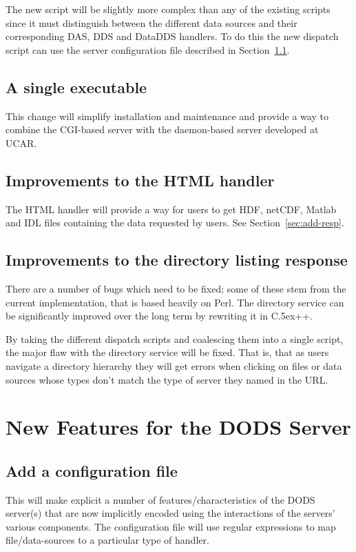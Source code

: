 \documentclass{article}
\newcommand{\Cpp}{\rm {\small C}\raise.5ex\hbox{\footnotesize ++}\xspace}
\begin{document}
The new script will be slightly more complex than any of the existing scripts
since it must distinguish between the different data sources and their
corresponding DAS, DDS and DataDDS handlers. To do this the new dispatch
script can use the server configuration file described in
Section~\ref{sec:config}. 

\subsection{A single executable}
This change will simplify installation and maintenance and provide a way to
combine the CGI-based server with the daemon-based server developed at UCAR.

\subsection{Improvements to the HTML handler}
The HTML handler will provide a way for users to get HDF, netCDF, Matlab and
IDL files containing the data requested by users. See
Section~\ref{sec:add-resp}.

\subsection{Improvements to the directory listing response}
\label{sec:directory}
There are a number of bugs which need to be fixed; some of these stem from
the current implementation, that is based heavily on Perl. The directory
service can be significantly improved over the long term by rewriting it in
\Cpp.

By taking the different dispatch scripts and coalescing them into a single
script, the major flaw with the directory service will be fixed. That is,
that as users navigate a directory hierarchy they will get errors when
clicking on files or data sources whose types don't match the type of server
they named in the URL.

\section{New Features for the DODS Server}
\label{sec:new-features}

\subsection{Add a configuration file}
\label{sec:config}
This will make explicit a number of features/characteristics of the DODS
server(s) that are now implicitly encoded using the interactions of the
servers' various components. The configuration file will use regular
expressions to map file/data-sources to a particular type of handler. 
\end{document}
